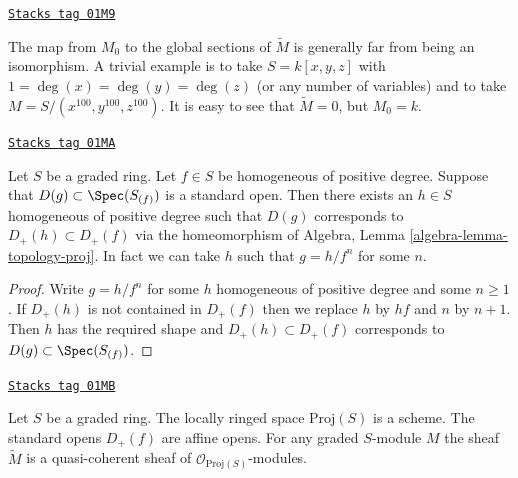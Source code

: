 \begin{remark}
\label{constructions-remark-global-sections-not-isomorphism}
\href{https://stacks.math.columbia.edu/tag/01M9}{\texttt{Stacks tag 01M9}}

The map from $M_0$ to the global sections of $\widetilde M$
is generally far from being an isomorphism. A trivial
example is to take $S = k[x, y, z]$ with $1 = \deg(x) = \deg(y) = \deg(z)$
(or any number of variables) and to take $M = S/(x^{100}, y^{100}, z^{100})$.
It is easy to see that $\widetilde M = 0$, but $M_0 = k$.
\end{remark}

\begin{lemma}
\label{constructions-lemma-standard-open-proj}
\href{https://stacks.math.columbia.edu/tag/01MA}{\texttt{Stacks tag 01MA}}

Let $S$ be a graded ring. Let $f \in S$ be homogeneous of positive degree.
Suppose that $D(g) \subset \Spec(S_{(f)})$ is a standard open.
Then there exists an $h \in S$ homogeneous of positive degree such that
$D(g)$ corresponds to $D_{+}(h) \subset D_{+}(f)$ via the homeomorphism
of Algebra, Lemma \ref{algebra-lemma-topology-proj}. In fact we can
take $h$ such that $g = h/f^n$ for some $n$.
\end{lemma}

\begin{proof}
Write $g = h/f^n$ for some $h$ homogeneous of positive degree
and some $n \geq 1$. If $D_{+}(h)$ is not contained in
$D_{+}(f)$ then we replace $h$ by $hf$ and $n$ by $n + 1$.
Then $h$ has the required shape and $D_{+}(h) \subset D_{+}(f)$
corresponds to $D(g) \subset \Spec(S_{(f)})$.
\end{proof}

\begin{lemma}
\label{constructions-lemma-proj-scheme}
\href{https://stacks.math.columbia.edu/tag/01MB}{\texttt{Stacks tag 01MB}}

Let $S$ be a graded ring.
The locally ringed space $\text{Proj}(S)$ is a scheme.
The standard opens $D_{+}(f)$ are affine opens.
For any graded $S$-module $M$ the sheaf
$\widetilde M$ is a quasi-coherent sheaf of
$\mathcal{O}_{\text{Proj}(S)}$-modules.
\end{lemma}

